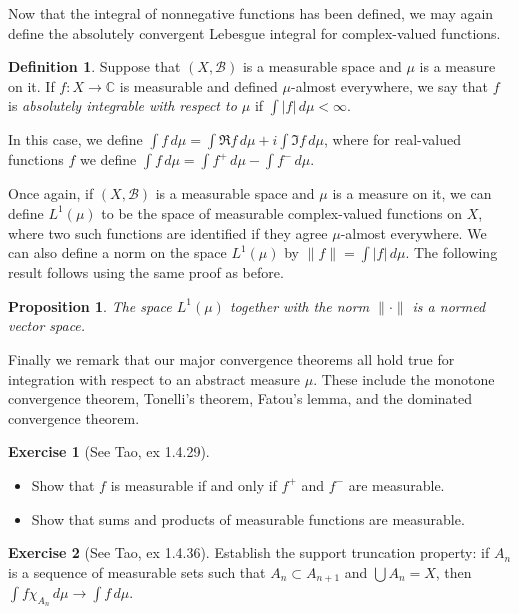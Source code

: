 \documentclass[11pt,oneside]{amsbook}
\newcommand{\CC}{{\mathbb C}}
\theoremstyle{definition}
\newtheorem{exerc}{Exercise}[section]
\theoremstyle{plain}
\newtheorem{prop}[thm]{Proposition}
\theoremstyle{definition}
\newtheorem{defn}[thm]{Definition}
\theoremstyle{remark}
\numberwithin{equation}{section}
\numberwithin{figure}{section}
\begin{document}
Now that the integral of nonnegative functions has been defined, we may again define the absolutely convergent Lebesgue integral for complex-valued functions.

\begin{defn}
  Suppose that $(X,\mathcal B)$ is a measurable space and $\mu$ is a measure on it. If $f\colon X\to\CC$ is measurable and defined $\mu$-almost everywhere, we say that $f$ is \emph{absolutely integrable with respect to $\mu$} if $\int|f|\,d\mu<\infty$.

  In this case, we define $\int f\,d\mu=\int\Re f\,d\mu+i\int\Im f\,d\mu$, where for real-valued functions $f$ we define $\int f\,d\mu=\int f^+\,d\mu-\int f^-\,d\mu$.
\end{defn}

Once again, if $(X,\mathcal B)$ is a measurable space and $\mu$ is a measure on it, we can define $L^1(\mu)$ to be the space of measurable complex-valued functions on $X$, where two such functions are identified if they agree $\mu$-almost everywhere. We can also define a norm on the space $L^1(\mu)$ by $\|f\|=\int|f|\,d\mu$. The following result follows using the same proof as before.

\begin{prop}
  The space $L^1(\mu)$ together with the norm $\|\cdot\|$ is a normed vector space.
\end{prop}

Finally we remark that our major convergence theorems all hold true for integration with respect to an abstract measure $\mu$. These include the monotone convergence theorem, Tonelli's theorem, Fatou's lemma, and the dominated convergence theorem.

\begin{exerc}[See Tao, ex 1.4.29]
  \begin{itemize}
    \item Show that $f$ is measurable if and only if $f^+$ and $f^-$ are measurable.
    \item Show that sums and products of measurable functions are measurable.
  \end{itemize}
\end{exerc}

\begin{exerc}[See Tao, ex 1.4.36]
  Establish the support truncation property: if $A_n$ is a sequence of measurable sets such that $A_n\subset A_{n+1}$ and $\bigcup A_n=X$, then $\int f\chi_{A_n}\,d\mu\to\int f\,d\mu$.
\end{exerc}
\end{document}
